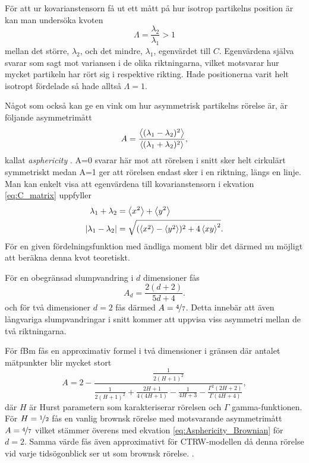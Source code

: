 För att ur kovarianstensorn få ut ett mått på hur isotrop partikelns position är kan man undersöka kvoten
\begin{equation}
\varLambda = \frac{\lambda_2}{\lambda_1} >1
\end{equation} 
mellan det större, $\lambda_2$, och det mindre, $\lambda_1$,  egenvärdet till $C$. Egenvärdena själva svarar som sagt mot variansen i de olika riktningarna, vilket motsvarar hur mycket partikeln har rört sig i respektive rikting. Hade positionerna varit helt isotropt fördelade så hade alltså $\varLambda=1$. 

Något som också kan ge en vink om hur asymmetrisk partikelns rörelse är, är följande asymmetrimått \cite{Hong_asymmetri1998}
\begin{equation}
A=\dfrac{\ev{(\lambda_1 - \lambda_2)^2}}{\ev{(\lambda_1 + \lambda_2)^2}},
\end{equation}
kallat  \emph{asphericity} \cite{Rudnick_Asphericity1986}. A=0 svarar här mot att rörelsen i snitt sker helt cirkulärt symmetriskt medan A=1 ger att rörelsen endast sker i en riktning, längs en linje. Man kan enkelt visa att egenvärdena till kovarianstensorn i ekvation \eqref{eq:C_matrix} uppfyller
\begin{align}
    \lambda_1+\lambda_2 &= \ev{x^2}+\ev{y^2} \\
    \abs{\lambda_1-\lambda_2} &= \sqrt{(\ev{x^2}-\ev{y^2})^2 + 4\ev{xy}^2}.
\end{align} %
För en given fördelningsfunktion med ändliga moment blir det därmed nu möjligt att beräkna denna kvot teoretiskt.

För en obegränsad slumpvandring i $d$ dimensioner fås 
\begin{equation} \label{eq:Asphericity_Brownian}
    A_d=\frac{2(d+2)}{5d+4}.
\end{equation}
och för två dimensioner $d=2$ fås därmed $A=\nicefrac{4}{7}$. Detta innebär att även långvariga slumpvandringar i snitt kommer att uppvisa viss asymmetri mellan de två riktningarna. 

För fBm fås en approximativ formel i två dimensioner i gränsen där antalet mätpunkter blir mycket stort ~\cite{Hong_asymmetri1998}
\begin{equation} \label{eq:A_fBm}
A=2-\frac{\frac{1}{2(H+1)^2}}{\frac{1}{2(H+1)^2}+\frac{2H+1}{4(4H+1)}-\frac{1}{4H+3}-\frac{\Gamma^2(2H+2)}{\Gamma(4H+4)}},
\end{equation}
där $H$ är Hurst parametern som karakteriserar rörelsen och $\Gamma$ gamma-funktionen. För $H=\nicefrac{1}{2}$ fås en vanlig brownsk rörelse med motsvarande  asymmetrimått $A=\nicefrac{4}{7}$ vilket stämmer överens med ekvation \eqref{eq:Asphericity_Brownian} för $d=2$. Samma värde fås även approximativt för CTRW-modellen \cite{Ernst_ACTRW2012} då denna rörelse vid varje tidsögonblick ser ut som brownsk rörelse. .


